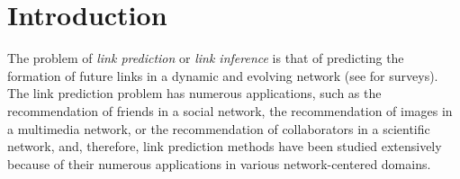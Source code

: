 \section{Introduction}
\label{sec-intro}
The problem of {\em link prediction} or {\em link inference} is that
of predicting the formation of future links in a dynamic and
evolving network (see \cite{chancc,linyuan-2011,Hasan-2011} for surveys). The link prediction problem has numerous
applications, such as the recommendation of friends in a social
network, the recommendation of images in a multimedia network, or
the recommendation of collaborators in a scientific network, and, therefore, link
prediction methods have been studied extensively because of their numerous applications in various network-centered domains.

